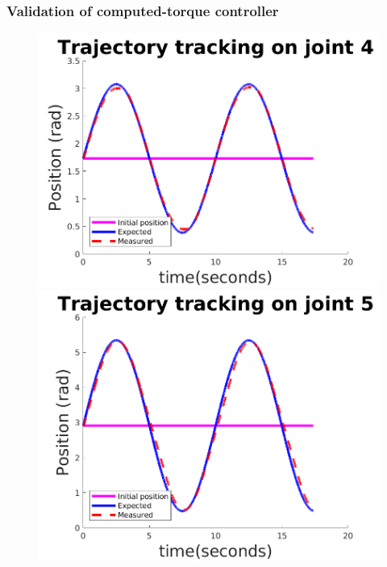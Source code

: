 \documentclass{beamer}
\begin{document}
\begin{frame}
	\frametitle{Validation of computed-torque controller}
\vspace{-0.3cm}
\begin{figure}
\centering
\begin{minipage}{.45\textwidth}
  \centering
  \includegraphics[trim=0 0 0 0,width=0.9\linewidth]{images/joint4_trajectory}
\end{minipage}
\begin{minipage}{.45\textwidth}
  \centering
  \includegraphics[trim=0 0 0 0,width=0.85\linewidth]{images/joint5_trajectory}
\end{minipage}
\end{figure}	
\vspace{-0.4cm}
\begin{figure}
\centering

\end{figure}
\end{frame}
\end{document}
